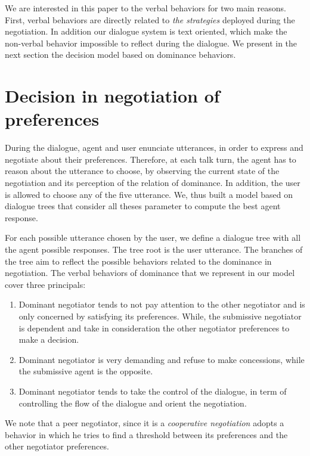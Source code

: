 \documentclass{llncs}
\begin{document}
\par We are interested in this paper to the verbal behaviors for two main reasons. First, verbal behaviors are directly related to \emph{the strategies} deployed during the negotiation. In addition our dialogue system is text oriented, which make the non-verbal behavior impossible to reflect during the dialogue. 
We present in the next section the decision model based on dominance behaviors.

\section{Decision in negotiation of preferences}
During the dialogue, agent and user enunciate utterances, in order to express and negotiate about their preferences. Therefore, at each talk turn, the agent has to reason about the utterance to choose, by observing  the current state of the negotiation and its perception of the relation of dominance. In addition, the user is allowed to choose any of the five utterance. We, thus built a model based on dialogue trees that consider all theses parameter to compute the best agent response. 

\par For each possible utterance chosen by the user, we define a dialogue tree with all the agent possible responses. The tree root is the user utterance. The branches of the tree aim to reflect the possible behaviors related to the dominance in negotiation. 
 The verbal behaviors of dominance that we represent in our model cover three principals:

\begin{enumerate}
	\item Dominant negotiator tends to not pay attention to the other negotiator and is only concerned by satisfying its preferences. While, the submissive negotiator is dependent and take in consideration the other negotiator preferences  to make a decision.
	\item Dominant negotiator is very demanding and  refuse to make concessions, while the submissive agent is the opposite.
	\item Dominant negotiator tends to take the control of the dialogue, in term of controlling the flow of the dialogue and orient the negotiation. 
\end{enumerate}

We note that a peer negotiator, since it is a \emph{cooperative negotiation} adopts a behavior in which he tries to find a threshold between its preferences and the other negotiator preferences.
\end{document}
